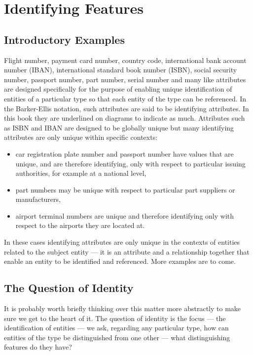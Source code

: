 \section{Identifying Features}
\label{IdentifyingFeatures}

\subsection{Introductory Examples}
\mynote
Flight number, payment card number, country code, international bank account number (IBAN), 
international standard book number (ISBN), social security number, passport number, part number, serial number and many like attributes are designed specifically for the purpose of enabling unique identification of entities of a particular type so that each entity of the type can be referenced. 
In the Barker-Ellis notation, such attributes are said to be identifying attributes. In this book they are underlined 
on diagrams to indicate as much. 
Attributes such as ISBN and IBAN are designed to be globally unique but many identifying attributes are only unique within specific contexts:
\begin{itemize}
\item
car registration plate number and passport number have values that are unique, and are therefore identifying, only with respect to particular issuing authorities, for example at a national level,
\item part numbers may be unique with respect to particular part suppliers or manufacturers,
\item airport terminal numbers are unique and therefore identifying only with respect to the airports they are located at.
\end{itemize}
In these cases identifying attributes are only unique in the contexts of entities related to the subject entity --- it is an attribute and a relationship together that enable an entity to be identified and referenced. More examples are to come.

\subsection{The Question of Identity}
\mynote
It is probably worth briefly thinking over this matter more abstractly to make sure we get to the heart of it. The question of identity is the focus --- the identification of entities ---  we ask, regarding any particular type, how can entities of the type be distinguished from one other 
--- what distinguishing features do they have? 

